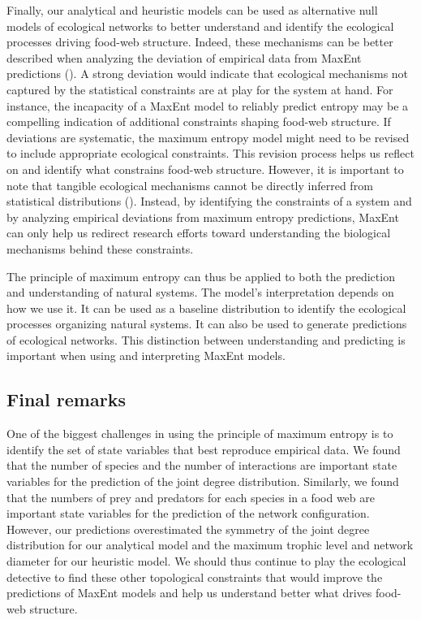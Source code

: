 Finally, our analytical and heuristic models can be used as alternative null
models of ecological networks to better understand and identify the ecological
processes driving food-web structure. Indeed, these mechanisms can be better
described when analyzing the deviation of empirical data from MaxEnt predictions
(\cite{Caruso2022Fluctuating}). A strong deviation would indicate that ecological
mechanisms not captured by the statistical constraints are at play for the
system at hand. For instance, the incapacity of a MaxEnt model to reliably
predict entropy may be a compelling indication of additional constraints shaping
food-web structure. If deviations are systematic, the maximum entropy model
might need to be revised to include appropriate ecological constraints. This
revision process helps us reflect on and identify what constrains food-web
structure. However, it is important to note that tangible ecological mechanisms
cannot be directly inferred from statistical distributions
(\cite{WarrenII2022Seeing}). Instead, by identifying the constraints of a
system and by analyzing empirical deviations from maximum entropy predictions,
MaxEnt can only help us redirect research efforts toward understanding the
biological mechanisms behind these constraints. 

The principle of maximum entropy can thus be applied to both the prediction and
understanding of natural systems. The model's interpretation depends on how we
use it. It can be used as a baseline distribution to identify the ecological
processes organizing natural systems. It can also be used to generate
predictions of ecological networks. This distinction between understanding and
predicting is important when using and interpreting MaxEnt models. 

\subsection{Final remarks}

One of the biggest challenges in using the principle of maximum entropy is to
identify the set of state variables that best reproduce empirical data. We found
that the number of species and the number of interactions are important state
variables for the prediction of the joint degree distribution. Similarly, we
found that the numbers of prey and predators for each species in a food web are
important state variables for the prediction of the network configuration.
However, our predictions overestimated the symmetry of the joint degree
distribution for our analytical model and the maximum trophic level and network
diameter for our heuristic model. We should thus continue to play the ecological
detective to find these other topological constraints that would improve the
predictions of MaxEnt models and help us understand better what drives food-web
structure.

